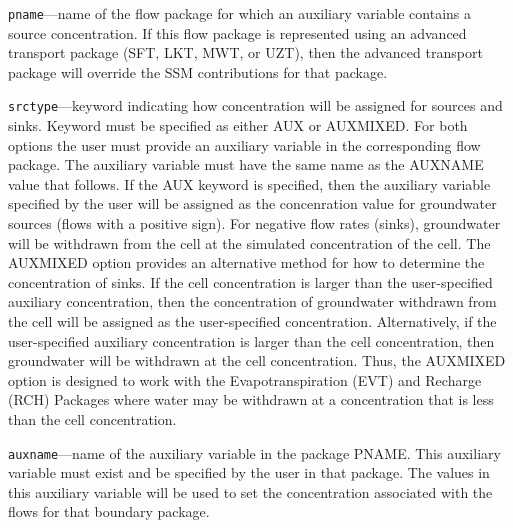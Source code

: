 \begin{description}
\item \texttt{pname}---name of the flow package for which an auxiliary variable contains a source concentration.  If this flow package is represented using an advanced transport package (SFT, LKT, MWT, or UZT), then the advanced transport package will override the SSM contributions for that package.

\item \texttt{srctype}---keyword indicating how concentration will be assigned for sources and sinks.  Keyword must be specified as either AUX or AUXMIXED.  For both options the user must provide an auxiliary variable in the corresponding flow package.  The auxiliary variable must have the same name as the AUXNAME value that follows.  If the AUX keyword is specified, then the auxiliary variable specified by the user will be assigned as the concenration value for groundwater sources (flows with a positive sign).  For negative flow rates (sinks), groundwater will be withdrawn from the cell at the simulated concentration of the cell.  The AUXMIXED option provides an alternative method for how to determine the concentration of sinks.  If the cell concentration is larger than the user-specified auxiliary concentration, then the concentration of groundwater withdrawn from the cell will be assigned as the user-specified concentration.  Alternatively, if the user-specified auxiliary concentration is larger than the cell concentration, then groundwater will be withdrawn at the cell concentration.  Thus, the AUXMIXED option is designed to work with the Evapotranspiration (EVT) and Recharge (RCH) Packages where water may be withdrawn at a concentration that is less than the cell concentration.

\item \texttt{auxname}---name of the auxiliary variable in the package PNAME.  This auxiliary variable must exist and be specified by the user in that package.  The values in this auxiliary variable will be used to set the concentration associated with the flows for that boundary package.

\end{description}

